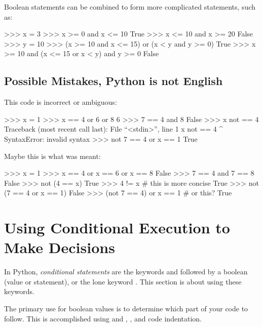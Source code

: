 \documentclass[11pt]{cselabheader}
\begin{document}
Boolean statements can be combined to form more complicated statements,
such as:

\begin{pyconcode}
>>> x = 3
>>> x >= 0 and x <= 10
True
>>> x <= 10 and x >= 20
False
>>> y = 10
>>> (x >= 10 and x <= 15) or (x < y and y >= 0)
True
>>> x >= 10 and (x <= 15 or x < y) and y >= 0
False

\end{pyconcode}

\subsection{Possible Mistakes, Python is not English}

\begin{multicols}{2}
This code is incorrect or ambiguous:
\begin{pyconcode}
>>> x = 1
>>> x == 4 or 6 or 8
6
>>> 7 == 4 and 8
False
>>> x not == 4
Traceback (most recent call last):
  File ``<stdin>'', line 1
    x not == 4
           ^
SyntaxError: invalid syntax
>>> not 7 == 4 or x == 1
True

\end{pyconcode}

\columnbreak

Maybe this is what was meant:
\begin{pyconcode}
>>> x = 1
>>> x == 4 or x == 6 or x == 8
False
>>> 7 == 4 and 7 == 8
False
>>> not (4 == x)
True
>>> 4 != x # this is more concise
True
>>> not (7 == 4 or x == 1)
False
>>> (not 7 == 4) or x == 1 # or this?
True

\end{pyconcode}
\end{multicols}

\section{Using Conditional Execution to Make Decisions}

In Python, \textsl{conditional statements}
are the keywords  and  followed by
a boolean (value or statement), or the lone keyword
. This section is about using these keywords.

The primary use for boolean values is to determine which part of
your code to follow. This is accomplished using  and
, , and code indentation.
\end{document}
